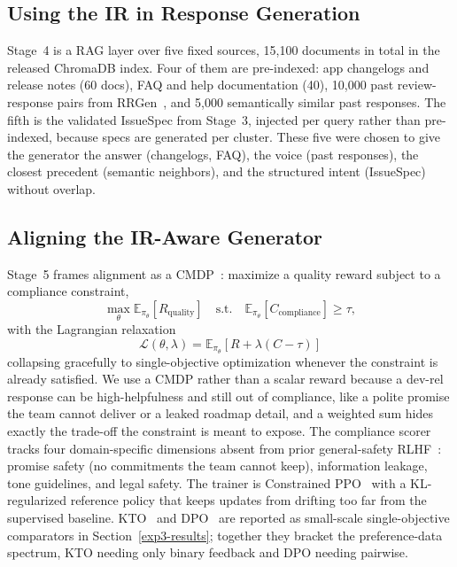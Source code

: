 \documentclass[preprint,12pt]{elsarticle}
\begin{document}
\subsection{Using the IR in Response Generation}\label{aim2}

Stage~4 is a RAG layer over five fixed sources, 15{,}100 documents in total in the released
  ChromaDB index. Four of them are pre-indexed: app changelogs and release notes (60 docs), FAQ
  and help documentation (40), 10{,}000 past review-response pairs from
  RRGen~\cite{gao2019automating}, and 5{,}000 semantically similar past responses. The fifth is the
  validated IssueSpec from Stage~3, injected per query rather than pre-indexed, because specs
  are generated per cluster. These five were chosen to give the generator the answer (changelogs, FAQ), the voice (past responses), the closest precedent (semantic neighbors), and the structured intent (IssueSpec) without overlap.
  
\subsection{Aligning the IR-Aware Generator}\label{aim3}

Stage~5 frames alignment as a CMDP~\cite{altman2021constrained, dai2024safe}:
  maximize a quality reward subject to a compliance constraint,
  \[
  \max_\theta \mathbb{E}_{\pi_\theta}[R_{\text{quality}}] \quad
  \text{s.t.} \quad \mathbb{E}_{\pi_\theta}[C_{\text{compliance}}] \ge
  \tau,
  \] 
  with the Lagrangian relaxation
  \[
  \mathcal{L}(\theta,\lambda) = \mathbb{E}_{\pi_\theta}[R + \lambda(C -
  \tau)]
  \]
  collapsing gracefully to single-objective optimization whenever the
  constraint is already satisfied. We use a CMDP rather than a scalar
  reward because a dev-rel response can be high-helpfulness and still
  out of compliance, like a polite promise the team cannot deliver or a
  leaked roadmap detail, and a weighted sum hides exactly the trade-off
  the constraint is meant to expose. The compliance scorer tracks four
  domain-specific dimensions absent from prior general-safety
  RLHF~\cite{dai2024safe}: promise safety (no commitments the team cannot
  keep), information leakage, tone guidelines, and legal safety. The
  trainer is Constrained PPO~\cite{schulman2017proximal, dai2024safe} with a
  KL-regularized reference policy that keeps updates from drifting too
  far from the supervised baseline.
  KTO~\cite{ethayarajh2024kto} and DPO~\cite{rafailov2023direct} are reported as
  small-scale single-objective comparators in
  Section~\ref{exp3-results}; together they bracket the preference-data
  spectrum, KTO needing only binary feedback and DPO needing pairwise.
\end{document}
